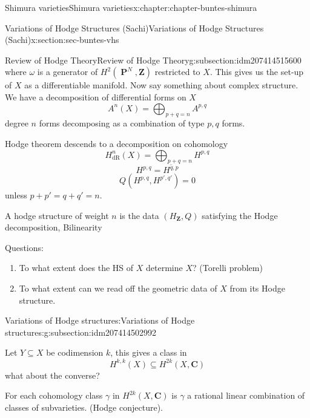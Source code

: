 \documentclass[oneside,10pt,]{book}
\numberwithin{equation}{section}
\newcommand{\ZZ}{\mathbf{Z}}
\newcommand{\CC}{\mathbf{C}}
\newcommand{\dR}{\mathrm{dR}}
\DeclareMathOperator{\PP}{\mathbf{P}}
\begin{document}
\begin{chapterptx}{Shimura varieties}{}{Shimura varieties}{}{}{x:chapter:chapter-buntes-shimura}
\begin{sectionptx}{Variations of Hodge Structures (Sachi)}{}{Variations of Hodge Structures (Sachi)}{}{}{x:section:sec-buntes-vhs}
\begin{subsectionptx}{Review of Hodge Theory}{}{Review of Hodge Theory}{}{}{g:subsection:idm207414515600}
\begin{equation*}
\end{equation*}
where \(\omega\) is a generator of \(H^2( \PP^N , \ZZ)\) restricted to \(X\). This gives us the set-up of \(X\) as a differentiable manifold. Now say something about complex structure. We have a decomposition of differential forms on \(X\)%
\begin{equation*}
A^n(X) = \bigoplus_{p+q  =n} A^{p,q}
\end{equation*}
degree \(n\) forms decomposing as a combination of type \(p,q\) forms.%
\par
Hodge theorem descends to a decomposition on cohomology%
\begin{equation*}
H^n_\dR(X) = \bigoplus_{p+q = n} H^{p,q}
\end{equation*}
%
\begin{equation*}
H^{p,q} = \overline{H^{q,p}}
\end{equation*}
%
\begin{equation*}
Q(H^{p,q}, H^{p',q'}) = 0
\end{equation*}
unless \(p+p' = q+q' = n\).%
\par
A hodge structure of weight \(n\) is the data \((H_\ZZ, Q)\) satisfying the Hodge decomposition, Bilinearity%
\par
Questions:%
\begin{enumerate}
\item{}To what extent does the HS of \(X\) determine \(X\)? (Torelli problem)%
\item{}To what extent can we read off the geometric data of \(X\) from its Hodge structure.%
\end{enumerate}
%
\end{subsectionptx}
%
%
\typeout{************************************************}
\typeout{************************************************}
%
\begin{subsectionptx}{Variations of Hodge structures:}{}{Variations of Hodge structures:}{}{}{g:subsection:idm207414502992}
\begin{introduction}{}%
Let \(Y \subseteq X\) be codimension \(k\), this gives a class in%
\begin{equation*}
H^{k,k}(X) \subseteq H^{2k}(X,\CC)
\end{equation*}
what about the converse?%
\par
For each cohomology class \(\gamma\)  in \(H^{2k} (X,\CC)\) is \(\gamma\) a rational linear combination of classes of subvarieties. (Hodge conjecture).%
\end{introduction}%

\end{subsectionptx}
\end{sectionptx}
\end{chapterptx}
\end{document}
